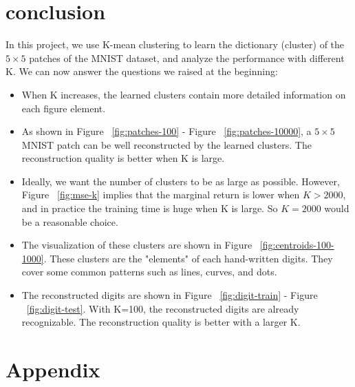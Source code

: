 \documentclass{article}
\begin{document}
\section{conclusion}

In this project, we use K-mean clustering to learn the dictionary (cluster) of the $5\times 5$ patches of the MNIST dataset, and analyze the performance with different K. We can now answer the questions we raised at the beginning:

\begin{itemize}
    \item When K increases, the learned clusters contain more detailed information on each figure element.
    \item As shown in Figure ~\ref{fig:patches-100} - Figure ~\ref{fig:patches-10000}, a $5\times 5$ MNIST patch can be well reconstructed by the learned clusters. The reconstruction quality is better when K is large.    
    \item Ideally, we want the number of clusters to be as large as possible. However, Figure ~\ref{fig:mse-k} implies that the marginal return is lower when $K>2000$, and in practice the training time is huge when K is large. So $K=2000$ would be a reasonable choice.
    \item The visualization of these clusters are shown in Figure ~\ref{fig:centroids-100-1000}. These clusters are the "elements" of each hand-written digits. They cover some common patterns such as lines, curves, and dots.
    \item The reconstructed digits are shown in Figure ~\ref{fig:digit-train} - Figure ~\ref{fig:digit-test}. With K=100, the reconstructed digits are already recognizable. The reconstruction quality is better with a larger K.
\end{itemize}

\newpage
\section*{Appendix}








\end{document}
